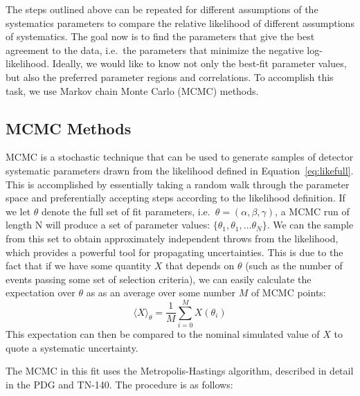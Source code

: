 {The steps outlined above can be repeated for different assumptions of the
systematics parameters to compare the relative likelihood of different
assumptions of systematics.  The goal now is to find the parameters that give
the best agreement to the data, i.e.\ the parameters that minimize the negative
log-likelihood.  Ideally, we would like to know not only the best-fit parameter
values, but also the preferred parameter regions and correlations.  To
accomplish this task, we use Markov chain Monte Carlo (MCMC) methods.



\subsection{MCMC Methods}
\label{subsec:mcmc}

MCMC is a stochastic technique that can be used to generate samples of detector
systematic parameters drawn from the likelihood defined in
Equation~\ref{eq:likefull}.  This is accomplished by essentially taking a
random walk through the parameter space and preferentially accepting steps
according to the likelihood definition. If we let $\theta$ denote the full set
of fit parameters, i.e.\ $\theta = (\alpha,\beta,\gamma)$, a MCMC run of length
N will produce a set of parameter values: $\{\theta_{1}, \theta_{1}, \dots
\theta_{N}\}$.  We can the sample from this set to obtain approximately
independent throws from the likelihood, which provides a powerful tool for
propagating uncertainties.  This is due to the fact that if we have some
quantity $X$ that depends on $\theta$ (such as the number of events passing
some set of selection criteria), we can easily calculate the expectation over
$\theta$ as as an average over some number $M$ of MCMC points:
%
\begin{equation}
  \label{eq:mcmcexp}
  \langle X \rangle_{\theta} = \frac{1}{M}\sum\limits_{i=0}^{M}X(\theta_{i})
\end{equation}
%
This expectation can then be compared to the nominal simulated value of $X$ to
quote a systematic uncertainty.

The MCMC in this fit uses the Metropolis-Hastings algorithm, described
in detail in the PDG and TN-140.  The procedure is as follows:

}
